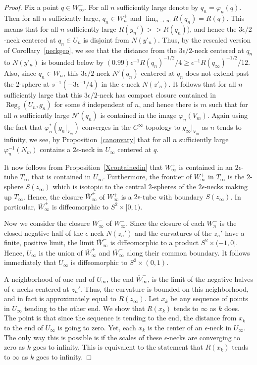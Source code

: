 \begin{proof}
Fix a point $q\in W^+_\infty$.
 For all $n$ sufficiently large denote by $q_n=\varphi_n(q)$.
 Then for all $n$ sufficiently large, $q_n\in W^+_n$ and
$\lim_{n\rightarrow\infty}R(q_n)=R(q)$. This means that for all
$n$ sufficiently large $R(y_n')>>R(q_n))$, and hence
 the $3\epsilon/2$-neck centered at
 $q_n\in U_n$ is disjoint from $N(y'_n)$. Thus, by the rescaled version of
 Corollary~\ref{neckgeo}, we see that  the distance from
 the $3\epsilon/2$-neck centered at $q_n$ to $N(y'_n)$ is bounded below by
 $(0.99)\epsilon^{-1}R(q_n)^{-1/2}/4\ge \epsilon^{-1}R(q_\infty)^{-1/2}/12$.
 Also, since $q_n\in W_n$, this $3\epsilon/2$-neck $N'(q_n)$ centered at
 $q_n$ does not extend past the $2$-sphere at $s^{-1}(-3\epsilon^{-1}/4)$ in the
 $ \epsilon$-neck $N(z'_n)$. It follows that for all $n$ sufficiently large that
 this $3\epsilon/2$-neck has
 compact closure contained in $\operatorname{Reg}_\delta(U_n,g_n)$ for some $\delta$
 independent of $n$, and hence there is $m$ such that for all $n$ sufficiently large $N'(q_n)$ is
 contained in the image $\varphi_n(V_m)$. Again using the fact that
 $\varphi_n^*(g_n|_{V_m})$ converges in the $C^\infty$-topology to
 $g_\infty|_{V_m}$ as $n$ tends to infinity, we see, by Proposition~\ref{canonvary}
 that for all $n$
 sufficiently large $\varphi_n^{-1}(N_m)$ contains a $2\epsilon$-neck in $U_\infty$ centered
 at $q$.


It now follows from Proposition~\ref{Xcontainedin} that $W^+_\infty$
is contained in an $2\epsilon$-tube $T_\infty$ that is contained in
$U_\infty$. Furthermore, the frontier of $W^+_\infty$ in $T_\infty$
is the $2$-sphere $S(z_\infty)$ which is isotopic to the central
$2$-spheres of the $2\epsilon$-necks making up $T_\infty$. Hence,
the closure $\overline W^+_\infty$ of $W^+_\infty$ is a
$2\epsilon$-tube with boundary $S(z_\infty)$. In particular,
$\overline W^+_\infty$ is diffeomorphic to $S^2\times [0,1)$.

Now we consider the closure $\overline W^-_\infty$ of  $W^-_\infty$.
Since the closure of each $W^-_n$ is the closed negative half of the
$\epsilon$-neck $N(z_n')$ and the curvatures of the $z_n'$ have a
finite, positive limit, the limit $\overline W^-_\infty$ is
diffeomorphic to a product $S^2\times (-1,0]$. Hence, $U_\infty$ is
the union of  $\overline W^+_\infty$ and  $\overline W^-_\infty$
along their common boundary. It follows immediately that $U_\infty$
is diffeomorphic to $S^2\times (0,1)$.


 A neighborhood of one end of $U_\infty$, the end $\overline W^-_\infty$,
 is the limit of the
 negative halves of $\epsilon$-necks centered at $z_n'$.
 Thus, the curvature is bounded on this neighborhood, and in fact is
approximately equal to $R(z_\infty)$. Let $x_k$ be any sequence of
points in $U_\infty$ tending to the other end. We show that $R(x_k)$
tends to $\infty$ as $k$ does. The point is that since the sequence
is tending to the end, the distance from $x_k$ to the end of
$U_\infty$ is going to zero. Yet, each $x_k$ is the center of an
$\epsilon$-neck in $U_\infty$. The only way this is possible is if
the scales of these $\epsilon$-necks are converging to zero as $k$
goes to infinity. This is equivalent to the statement that $R(x_k)$
tends to $\infty$ as $k$ goes to infinity.



\end{proof}
